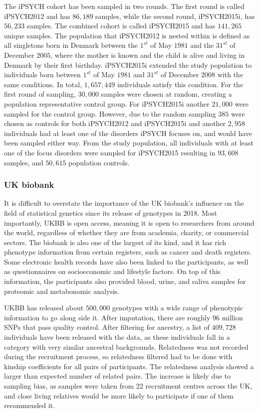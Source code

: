 The iPSYCH cohort has been sampled in two rounds. The first round is called iPSYCH2012 and has $ 86,189 $ samples, while the second round, iPSYCH2015i, has $ 56,233 $ samples. The combined cohort is called iPSYCH2015 and has $ 141,265 $ unique samples. The population that iPSYCH2012 is nested within is defined as all singletons born in Denmark between the $ 1^{st} $ of May $ 1981 $ and the $ 31^{st} $ of December $ 2005 $, where the mother is known and the child is alive and living in Denmark by their first birthday. iPSYCH2015i extended the study population to individuals born between $ 1^{st} $ of May $ 1981 $ and $ 31^{st} $ of December $ 2008 $ with the same conditions. In total, $ 1,657,449 $ individuals satisfy this condition. For the first round of sampling, $ 30,000 $ samples were chosen at random, creating a population representative control group. For iPSYCH2015i another $ 21,000 $ were sampled for the control group. However, due to the random sampling $ 385 $ were chosen as controls for both iPSYCH2012 and iPSYCH2015i and another $ 2,958 $ individuals had at least one of the disorders iPSYCH focuses on, and would have been sampled either way. From the study population, all individuals with at least one of the focus disorders were sampled for iPSYCH2015 resulting in $ 93,608 $ samples, and $ 50,615 $ population controls. 

\subsubsection{UK biobank}

It is difficult to overstate the importance of the UK biobank's influence on the field of statistical genetics since its release of genotypes in 2018. Most importantly, UKBB is open access, meaning it is open to researchers from around the world, regardless of whether they are from academia, charity, or commercial sectors. The biobank is also one of the largest of its kind, and it has rich phenotype information from certain registers, such as cancer and death registers. Some electronic health records have also been linked to the participants, as well as questionnaires on socioeconomic and lifestyle factors. On top of this information, the participants also provided blood, urine, and saliva samples for proteomic and metabonomic analysis.

UKBB has released about $ 500,000 $ genotypes with a wide range of phenotypic information to go along side it. After imputation, there are roughly $ 96 $ million SNPs that pass quality control. After filtering for ancestry, a list of $ 409,728 $ individuals have been released with the data, as these individuals fall in a category with very similar ancestral backgrounds. Relatedness was not recorded during the recruitment process, so relatedness filtered had to be done with kinship coefficients for all pairs of participants. The relatedness analysis showed a larger than expected number of related pairs. The increase is likely due to sampling bias, as samples were taken from 22 recruitment centres across the UK, and close living relatives would be more likely to participate if one of them recommended it. \cite{bycroft2018uk,biobank2015genotyping}

